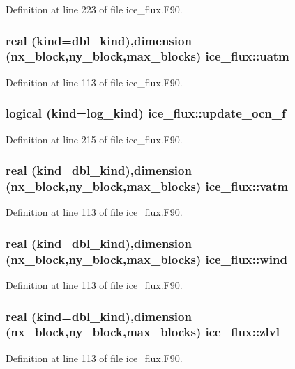 Definition at line 223 of file ice\_\-flux.F90.\hypertarget{namespaceice__flux_accb62713c4d53aa9f56bccfa4faf6507}{
\subsubsection[{uatm}]{\setlength{\rightskip}{0pt plus 5cm}real (kind=dbl\_\-kind),dimension (nx\_\-block,ny\_\-block,max\_\-blocks) {\bf ice\_\-flux::uatm}}}
\label{namespaceice__flux_accb62713c4d53aa9f56bccfa4faf6507}


Definition at line 113 of file ice\_\-flux.F90.\hypertarget{namespaceice__flux_ac97b083c2136cd4e0deb365a3a3f4f6b}{
\subsubsection[{update\_\-ocn\_\-f}]{\setlength{\rightskip}{0pt plus 5cm}logical (kind=log\_\-kind) {\bf ice\_\-flux::update\_\-ocn\_\-f}}}
\label{namespaceice__flux_ac97b083c2136cd4e0deb365a3a3f4f6b}


Definition at line 215 of file ice\_\-flux.F90.\hypertarget{namespaceice__flux_ace0435fd53553a1cae783a932576a39f}{
\subsubsection[{vatm}]{\setlength{\rightskip}{0pt plus 5cm}real (kind=dbl\_\-kind),dimension (nx\_\-block,ny\_\-block,max\_\-blocks) {\bf ice\_\-flux::vatm}}}
\label{namespaceice__flux_ace0435fd53553a1cae783a932576a39f}


Definition at line 113 of file ice\_\-flux.F90.\hypertarget{namespaceice__flux_a1f1bd9712740289c1c1348265a70e838}{
\subsubsection[{wind}]{\setlength{\rightskip}{0pt plus 5cm}real (kind=dbl\_\-kind),dimension (nx\_\-block,ny\_\-block,max\_\-blocks) {\bf ice\_\-flux::wind}}}
\label{namespaceice__flux_a1f1bd9712740289c1c1348265a70e838}


Definition at line 113 of file ice\_\-flux.F90.\hypertarget{namespaceice__flux_a760e7ef6ee3c277e293ab9a2f92685cb}{
\subsubsection[{zlvl}]{\setlength{\rightskip}{0pt plus 5cm}real (kind=dbl\_\-kind),dimension (nx\_\-block,ny\_\-block,max\_\-blocks) {\bf ice\_\-flux::zlvl}}}
\label{namespaceice__flux_a760e7ef6ee3c277e293ab9a2f92685cb}


Definition at line 113 of file ice\_\-flux.F90.